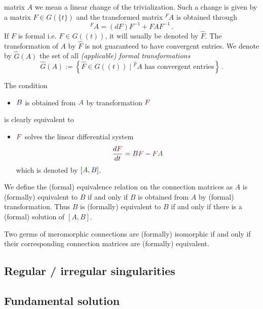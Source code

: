 matrix $A$ we mean a linear change of the trivialization. Such a change is given
by a matrix $F\in G(\!\{t\}\!)$ and the transformed matrix ${}^F\!A$ is
obtained through
\[
  {}^F\!A=(dF)F^{-1} + FAF^{-1} \,.
\]
If $F$ is formal i.e. $F\in G(\!(t)\!)$, it will usually be denoted by
$\hat F$. The transformation of $A$ by $\hat F$ is not guaranteed to have
convergent entries.
We denote by $\hat G(A)$ the set of all \emph{(applicable) formal
transformations}
\[
  \hat G(A):=\left\{\hat F\in G(\!(t)\!)
    \mid {}^{\hat F}\!A \text{ has convergent entries}
  \right\}\,.
\]
\begin{rem}
  \def\myB{\textcolor{blue!60!black}{B}}
  \def\myA{\textcolor{green!30!black}{A}}
  \def\myF{\textcolor{red!60!black}{F}}
  The condition
  \begin{itemize}
    \item[] $\myB$ is obtained from $\myA$ by transformation $\myF$
  \end{itemize}
  is clearly equivalent to
  \begin{itemize}
    \item[]  $\myF$ solves the linear differential system
      \[
        \frac{d\myF}{dt}=\myB\myF-\myF\myA
      \]
      which is denoted by $[\myA,\myB]$.
  \end{itemize}
\end{rem}
We define the (formal) equivalence relation on the connection matrices as $A$
is (formally) equivalent to $B$ if and only if $B$ is obtained from $A$ by
(formal) transformation. Thus $B$ is (formally) equivalent to $B$ if and only
if there is a (formal) solution of $[A,B]$.

\begin{defn}
  Two germs of meromorphic connections are (formally) isomorphic if and only if
  their corresponding connection matrices are (formally) equivalent.
\end{defn}

\subsection{Regular / irregular singularities}

\subsection{Fundamental solution}

